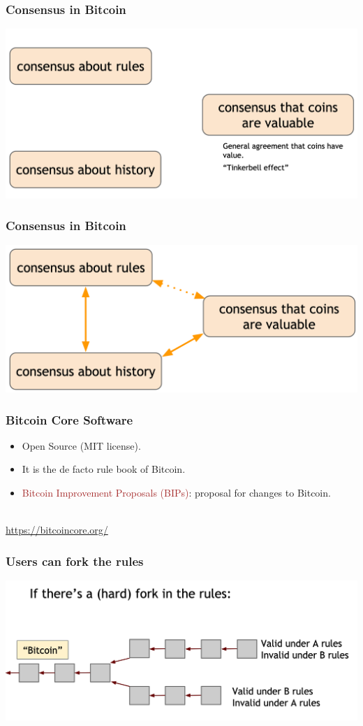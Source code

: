 \documentclass{beamer}
\begin{document}
\begin{frame}
  \frametitle{Consensus in Bitcoin}
 	\centering
	\includegraphics[scale=0.28]{value}
\end{frame}
\begin{frame}
  \frametitle{Consensus in Bitcoin}
 	\centering
	\includegraphics[scale=0.28]{all}
\end{frame}
\begin{frame}
  \frametitle{Bitcoin Core Software}
  \pause
  \begin{itemize}
  	\item Open Source (MIT license).
	\item It is the de facto rule book of Bitcoin.
	\item \textcolor{brown}{Bitcoin Improvement Proposals (BIPs)}: proposal for changes to Bitcoin.
  \end{itemize}
  $ $ \\ 
  \pause
  \url{https://bitcoincore.org/}
\end{frame}
\begin{frame}
  \frametitle{Users can fork the rules}
 	\centering
	\includegraphics[scale=0.3]{fork1}
\end{frame}
\end{document}
